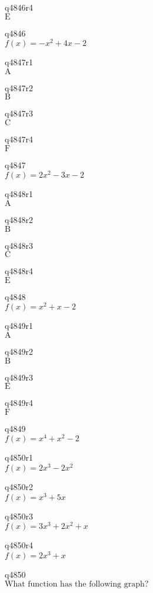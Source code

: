q4846r4\\
\(\displaystyle \text{E} \)

q4846\\
\(\displaystyle f(x) = -x^2 + 4x - 2 \)

q4847r1\\
\(\displaystyle \text{A} \)

q4847r2\\
\(\displaystyle \text{B} \)

q4847r3\\
\(\displaystyle \text{C} \)

q4847r4\\
\(\displaystyle \text{F} \)

q4847\\
\(\displaystyle f(x) = 2x^2 - 3x - 2 \)

q4848r1\\
\(\displaystyle \text{A} \)

q4848r2\\
\(\displaystyle \text{B} \)

q4848r3\\
\(\displaystyle \text{C} \)

q4848r4\\
\(\displaystyle \text{E} \)

q4848\\
\(\displaystyle f(x) = x^2 + x - 2 \)

q4849r1\\
\(\displaystyle \text{A} \)

q4849r2\\
\(\displaystyle \text{B} \)

q4849r3\\
\(\displaystyle \text{E} \)

q4849r4\\
\(\displaystyle \text{F} \)

q4849\\
\(\displaystyle f(x) = x^4 + x^2 - 2 \)

q4850r1\\
\(\displaystyle f(x) = 2x^3 - 2x^2 \)

q4850r2\\
\(\displaystyle f(x) = x^3 + 5x \)

q4850r3\\
\(\displaystyle f(x) = 3x^3 + 2x^2 + x \)

q4850r4\\
\(\displaystyle f(x) = 2x^3 + x \)

q4850\\
\(\displaystyle \text{What function has the following graph?} \)

